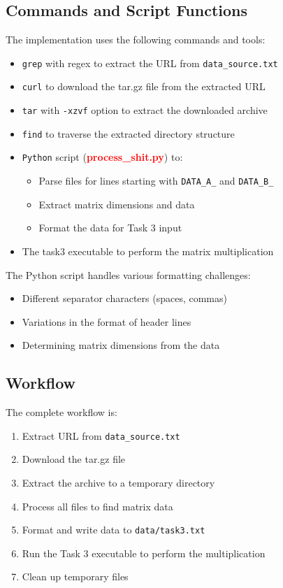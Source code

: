 \documentclass[11pt,a4paper]{article}
\begin{document}
\subsection{Commands and Script Functions}

The implementation uses the following commands and tools:

\begin{itemize}
    \item \texttt{grep} with regex to extract the URL from \texttt{data\_source.txt}
    \item \texttt{curl} to download the tar.gz file from the extracted URL
    \item \texttt{tar} with \texttt{-xzvf} option to extract the downloaded archive
    \item \texttt{find} to traverse the extracted directory structure
		\item \texttt{Python} script (\textcolor{red}{\textbf{process\_shit.py}}) to:
    \begin{itemize}
        \item Parse files for lines starting with \texttt{DATA\_A\_} and \texttt{DATA\_B\_}
        \item Extract matrix dimensions and data
        \item Format the data for Task 3 input
    \end{itemize}
    \item The task3 executable to perform the matrix multiplication
\end{itemize}

The Python script handles various formatting challenges:
\begin{itemize}
    \item Different separator characters (spaces, commas)
    \item Variations in the format of header lines
    \item Determining matrix dimensions from the data
\end{itemize}

\subsection{Workflow}
The complete workflow is:
\begin{enumerate}
    \item Extract URL from \texttt{data\_source.txt}
    \item Download the tar.gz file
    \item Extract the archive to a temporary directory
    \item Process all files to find matrix data
    \item Format and write data to \texttt{data/task3.txt}
    \item Run the Task 3 executable to perform the multiplication
    \item Clean up temporary files
\end{enumerate}
\end{document}
